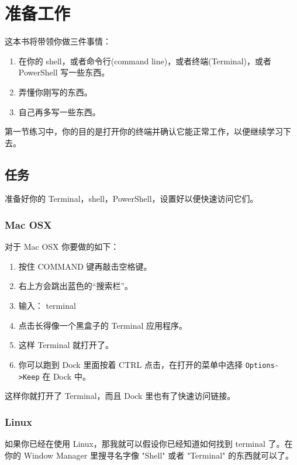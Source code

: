 \chapter{准备工作}

这本书将带领你做三件事情：

\begin{enumerate}
\item 在你的 shell，或者命令行(command line)，或者终端(Terminal)，或者 PowerShell 写一些东西。
\item 弄懂你刚写的东西。
\item 自己再多写一些东西。
\end{enumerate}

第一节练习中，你的目的是打开你的终端并确认它能正常工作，以便继续学习下去。

\section{任务}

准备好你的 Terminal，shell，PowerShell，设置好以便快速访问它们。

\subsection{Mac OSX}

对于 Mac OSX 你要做的如下：

\begin{enumerate}
\item 按住 COMMAND 键再敲击空格键。
\item 右上方会跳出蓝色的“搜索栏”。
\item 输入： terminal
\item 点击长得像一个黑盒子的 Terminal 应用程序。
\item 这样 Terminal 就打开了。
\item 你可以跑到 Dock 里面按着 CTRL 点击，在打开的菜单中选择 \verb|Options->Keep| 在 Dock 中。
\end{enumerate}

这样你就打开了 Terminal，而且 Dock 里也有了快速访问链接。

\subsection{Linux}

如果你已经在使用 Linux，那我就可以假设你已经知道如何找到 terminal 了。在你的 Window Manager
里搜寻名字像 "Shell" 或者 "Terminal" 的东西就可以了。

